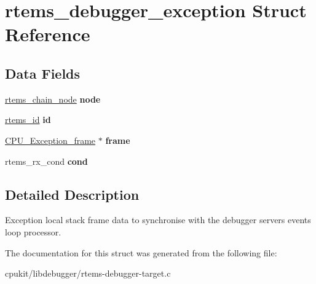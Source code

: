 \hypertarget{structrtems__debugger__exception}{}\section{rtems\+\_\+debugger\+\_\+exception Struct Reference}
\label{structrtems__debugger__exception}
\subsection*{Data Fields}
\begin{DoxyCompactItemize}
\item 
\mbox{\label{structrtems__debugger__exception_a2357f6629b05d83537033ed635096630}} 
\mbox{\hyperlink{structChain__Node__struct}{rtems\+\_\+chain\+\_\+node}} {\bfseries node}
\item 
\mbox{\label{structrtems__debugger__exception_ada95a8814d93b8c138e23082b021bd83}} 
\mbox{\hyperlink{group__ClassicTasks_gab20892b814dced7dd4e5b9bf42becd57}{rtems\+\_\+id}} {\bfseries id}
\item 
\mbox{\label{structrtems__debugger__exception_aadcd650f5bf5347886308bc10d394f29}} 
\mbox{\hyperlink{structCPU__Exception__frame}{C\+P\+U\+\_\+\+Exception\+\_\+frame}} $\ast$ {\bfseries frame}
\item 
\mbox{\label{structrtems__debugger__exception_a8eeeb0f0e907669e7cd237bd00dc10e8}} 
rtems\+\_\+rx\+\_\+cond {\bfseries cond}
\end{DoxyCompactItemize}


\subsection{Detailed Description}
Exception local stack frame data to synchronise with the debugger server\textquotesingle{}s events loop processor. 

The documentation for this struct was generated from the following file\+:\begin{DoxyCompactItemize}
\item 
cpukit/libdebugger/rtems-\/debugger-\/target.\+c\end{DoxyCompactItemize}
